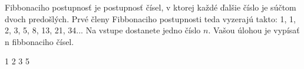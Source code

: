 




Fibbonaciho postupnosť je postupnosť čísel, v ktorej každé ďalšie číslo je súčtom dvoch predošlých. Prvé členy Fibbonaciho postupnosti teda vyzerajú takto: 1, 1, 2, 3, 5, 8, 13, 21, 34...
Na vstupe dostanete jedno číslo $n$. Vašou úlohou je vypísať n fibbonaciho čísel.

 1 2 3 5 
\koniec


